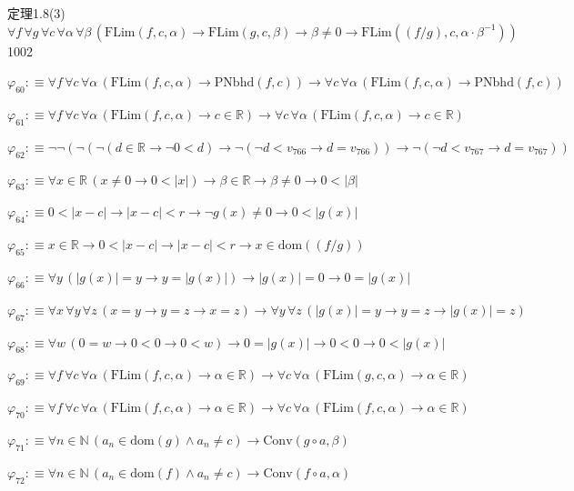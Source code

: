 \begin{fullproof}{定理1.8(3)}{$\forall f\,\forall g\,\forall c\,\forall \alpha\,\forall \beta\,(\mathrm{FLim}(f,c,\alpha) \to \mathrm{FLim}(g,c,\beta) \to \beta \neq 0 \to \mathrm{FLim}((f / g),c,\alpha \cdot \beta^{-1}))$}{1002}
\begin{abbrevlist}
\item $\varphi_{60} :\equiv \forall f\,\forall c\,\forall \alpha\,(\mathrm{FLim}(f,c,\alpha) \to \mathrm{PNbhd}(f,c)) \to \forall c\,\forall \alpha\,(\mathrm{FLim}(f,c,\alpha) \to \mathrm{PNbhd}(f,c))$
\item $\varphi_{61} :\equiv \forall f\,\forall c\,\forall \alpha\,(\mathrm{FLim}(f,c,\alpha) \to c \in \mathbb{R}) \to \forall c\,\forall \alpha\,(\mathrm{FLim}(f,c,\alpha) \to c \in \mathbb{R})$
\item $\varphi_{62} :\equiv \neg \neg (\neg (\neg (d \in \mathbb{R} \to \neg 0 < d) \to \neg (\neg d < v_{766} \to d = v_{766})) \to \neg (\neg d < v_{767} \to d = v_{767}))$
\item $\varphi_{63} :\equiv \forall x \in \mathbb{R}\,(x \neq 0 \to 0 < \lvert x \rvert) \to \beta \in \mathbb{R} \to \beta \neq 0 \to 0 < \lvert \beta \rvert$
\item $\varphi_{64} :\equiv 0 < \lvert x - c \rvert \to \lvert x - c \rvert < r \to \neg g(x) \neq 0 \to 0 < \lvert g(x) \rvert$
\item $\varphi_{65} :\equiv x \in \mathbb{R} \to 0 < \lvert x - c \rvert \to \lvert x - c \rvert < r \to x \in \mathrm{dom}((f / g))$
\item $\varphi_{66} :\equiv \forall y\,(\lvert g(x) \rvert = y \to y = \lvert g(x) \rvert) \to \lvert g(x) \rvert = 0 \to 0 = \lvert g(x) \rvert$
\item $\varphi_{67} :\equiv \forall x\,\forall y\,\forall z\,(x = y \to y = z \to x = z) \to \forall y\,\forall z\,(\lvert g(x) \rvert = y \to y = z \to \lvert g(x) \rvert = z)$
\item $\varphi_{68} :\equiv \forall w\,(0 = w \to 0 < 0 \to 0 < w) \to 0 = \lvert g(x) \rvert \to 0 < 0 \to 0 < \lvert g(x) \rvert$
\item $\varphi_{69} :\equiv \forall f\,\forall c\,\forall \alpha\,(\mathrm{FLim}(f,c,\alpha) \to \alpha \in \mathbb{R}) \to \forall c\,\forall \alpha\,(\mathrm{FLim}(g,c,\alpha) \to \alpha \in \mathbb{R})$
\item $\varphi_{70} :\equiv \forall f\,\forall c\,\forall \alpha\,(\mathrm{FLim}(f,c,\alpha) \to \alpha \in \mathbb{R}) \to \forall c\,\forall \alpha\,(\mathrm{FLim}(f,c,\alpha) \to \alpha \in \mathbb{R})$
\item $\varphi_{71} :\equiv \forall n \in \mathbb{N}\,(a_{n} \in \mathrm{dom}(g) \land a_{n} \neq c) \to \mathrm{Conv}(g \circ a,\beta)$
\item $\varphi_{72} :\equiv \forall n \in \mathbb{N}\,(a_{n} \in \mathrm{dom}(f) \land a_{n} \neq c) \to \mathrm{Conv}(f \circ a,\alpha)$

\end{abbrevlist}
\end{fullproof}
